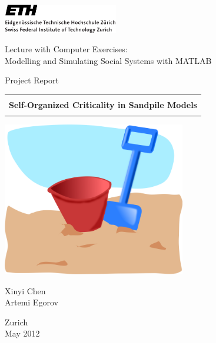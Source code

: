 
\thispagestyle{empty}

\begin{center}
\includegraphics[width=5cm]{ETHlogo.png}

\bigskip


\bigskip


\bigskip


\LARGE{ 	Lecture with Computer Exercises:\\ }
\LARGE{ Modelling and Simulating Social Systems with MATLAB\\}

\bigskip

\bigskip

\small{Project Report}\\

\bigskip





\begin{tabular}{|c|}
\hline
\\
\textbf{\LARGE{Self-Organized Criticality in Sandpile Models}}\\
\\
\hline
\end{tabular}
\bigskip

\bigskip

\bigskip

\includegraphics[width=8cm]{addon_bucket_and_spade.png}


\bigskip

\bigskip

\bigskip


\LARGE{Xinyi Chen \\ Artemi Egorov }





\bigskip

\bigskip




Zurich\\
May 2012\\

\end{center}


